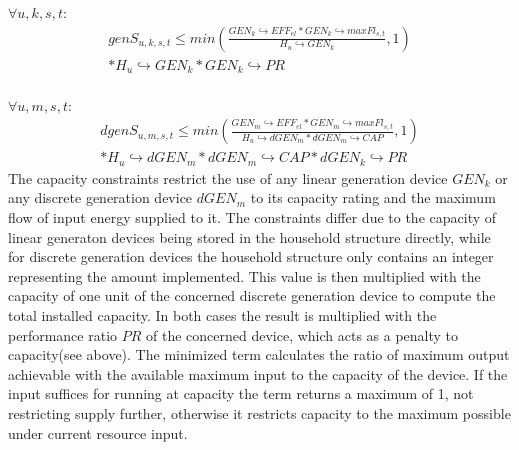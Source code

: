 \documentclass[
	11pt,								%
	DIV10,								%
	a4paper,         					%
	oneside,							%
	headheight=20pt,					%
	footheight=20pt,					%
    parskip=full,						%
    listof=totoc,						%
	bibliography=totoc,					%
	index=totoc,						%
]{scrartcl}
\begin{document}
	$\forall u,k,s,t$:
	\begin{equation}
		\begin{split}
		genS_{u,k,s,t} \leq min(\frac{GEN_k \hookrightarrow EFF_{el} * GEN_k \hookrightarrow maxFl_{s,t}}{H_u\hookrightarrow  GEN_k}, 1) \\ * H_u\hookrightarrow  GEN_k * GEN_k \hookrightarrow PR
		\end{split}
	\end{equation}
	\\
	$\forall u,m,s,t$:
	\begin{equation}
		\begin{split}
		dgenS_{u,m,s,t} \leq min(\frac{GEN_m \hookrightarrow EFF_{el} * GEN_m \hookrightarrow maxFl_{s,t}}{H_u \hookrightarrow  dGEN_m * dGEN_m \hookrightarrow CAP }, 1) \\ * H_u\hookrightarrow  dGEN_m * dGEN_m \hookrightarrow CAP * dGEN_k \hookrightarrow PR
		\end{split}
	\end{equation}
	The capacity constraints restrict the use of any linear generation device $GEN_k$ or any discrete generation device $dGEN_m$ to its capacity rating and the maximum flow of input energy supplied to it.
	The constraints differ due to the capacity of linear generaton devices being stored in the household structure directly, while for discrete generation devices the household structure only contains an integer representing the amount implemented. This value is then multiplied with the capacity of one unit of the concerned discrete generation device to compute the total installed capacity. In both cases the result is multiplied with the performance ratio $PR$ of the concerned device, which acts as a penalty to capacity(see above). The minimized term calculates the ratio of maximum output achievable with the available maximum input to the capacity of the device. If the input suffices for running at capacity the term returns a maximum of 1, not restricting supply further, otherwise it restricts capacity to the maximum possible under current resource input.

	
\end{document}
